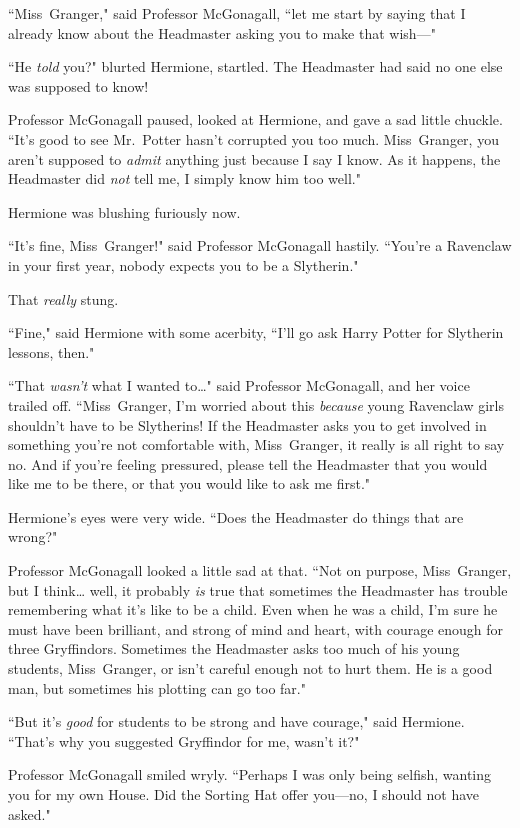 ``Miss~Granger," said Professor McGonagall, ``let me start by saying that I already know about the Headmaster asking you to make that wish—"

``He \emph{told} you?" blurted Hermione, startled. The Headmaster had said no one else was supposed to know!

Professor McGonagall paused, looked at Hermione, and gave a sad little chuckle. ``It's good to see Mr.~Potter hasn't corrupted you too much. Miss~Granger, you aren't supposed to \emph{admit} anything just because I say I know. As it happens, the Headmaster did \emph{not} tell me, I simply know him too well."

Hermione was blushing furiously now.

``It's fine, Miss~Granger!" said Professor McGonagall hastily. ``You're a Ravenclaw in your first year, nobody expects you to be a Slytherin."

That \emph{really} stung.

``Fine," said Hermione with some acerbity, ``I'll go ask Harry Potter for Slytherin lessons, then."

``That \emph{wasn't} what I wanted to{\ldots}" said Professor McGonagall, and her voice trailed off. ``Miss~Granger, I'm worried about this \emph{because} young Ravenclaw girls shouldn't have to be Slytherins! If the Headmaster asks you to get involved in something you're not comfortable with, Miss~Granger, it really is all right to say no. And if you're feeling pressured, please tell the Headmaster that you would like me to be there, or that you would like to ask me first."

Hermione's eyes were very wide. ``Does the Headmaster do things that are wrong?"

Professor McGonagall looked a little sad at that. ``Not on purpose, Miss~Granger, but I think{\ldots} well, it probably \emph{is} true that sometimes the Headmaster has trouble remembering what it's like to be a child. Even when he was a child, I'm sure he must have been brilliant, and strong of mind and heart, with courage enough for three Gryffindors. Sometimes the Headmaster asks too much of his young students, Miss~Granger, or isn't careful enough not to hurt them. He is a good man, but sometimes his plotting can go too far."

``But it's \emph{good} for students to be strong and have courage," said Hermione. ``That's why you suggested Gryffindor for me, wasn't it?"

Professor McGonagall smiled wryly. ``Perhaps I was only being selfish, wanting you for my own House. Did the Sorting Hat offer you—no, I should not have asked."

